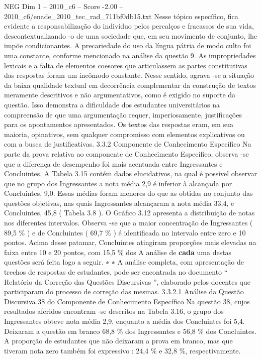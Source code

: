 \begin{textsample}{NEG Dim 1 – 2010\_c6 – Score -2.00 – 2010\_c6/enade\_2010\_tec\_rad\_711bf0db15.txt}
Nesse tópico específico, fica evidente a responsabilização do indivíduo pelos percalços e fracassos de sua vida, descontextualizando -o de uma sociedade que, em seu movimento de conjunto, lhe impõe condicionantes.
A precariedade do uso da língua pátria de modo culto foi uma constante, conforme mencionado na análise da questão 9.
As impropriedades lexicais e a falta de elementos coesores que articulassem as partes constitutivas das respostas foram um incômodo constante.
Nesse sentido, agrava -se a situação da baixa qualidade textual em decorrência complementar da construção de textos meramente descritivos e não argumentativos, como é exigido no suporte da questão.
Isso demonstra a dificuldade dos estudantes universitários na compreensão de que uma argumentação requer, imperiosamente, justificações para os apontamentos apresentados.
Os textos das respostas eram, em sua maioria, opinativos, sem qualquer compromisso com elementos explicativos ou com a busca de justificativas. 3.3.2 Componente de Conhecimento Específico Na parte da prova relativa ao componente de Conhecimento Específico, observa -se que a diferença de desempenho foi mais acentuada entre Ingressantes e Concluintes.
A Tabela 3.15 contém dados elucidativos, na qual é possível observar que no grupo dos Ingressantes a nota média 2,9 é inferior à alcançada por Concluintes, 9,0.
Essas médias foram menores do que as obtidas no conjunto das questões objetivas, nas quais Ingressantes alcançaram a nota média 33,4, e Concluintes, 45,8 ( Tabela 3.8 ).
O Gráfico 3.12 apresenta a distribuição de notas nos diferentes intervalos.
Observa -se que a maior concentração de Ingressantes ( 89,5 \% ) e de Concluintes ( 69,7 \% ) é identificada no intervalo entre zero e 10 pontos.
Acima desse patamar, Concluintes atingiram proporções mais elevadas na faixa entre 10 e 20 pontos, com 15,5 \% dos A análise de \textbf{cada} uma destas questões será feita logo a seguir. ∗ ∗ A análise completa, com apresentação de trechos de respostas de estudantes, pode ser encontrada no documento “ Relatório da Correção das Questões Discursivas ”, elaborado pelos docentes que participaram do processo de correção das mesmas. 3.3.2.1 Análise da Questão Discursiva 38 do Componente de Conhecimento Específico Na questão 38, cujos resultados aferidos encontram -se descritos na Tabela 3.16, o grupo dos Ingressantes obteve nota média 2,9, enquanto a média dos Concluintes foi 5,4.
Deixaram a questão em branco 68,8 \% dos Ingressantes e 56,8 \% dos Concluintes.
A proporção de estudantes que não deixaram a prova em branco, mas que tiveram nota zero também foi expressivo : 24,4 \% e 32,8 \%, respectivamente.

\end{textsample}
